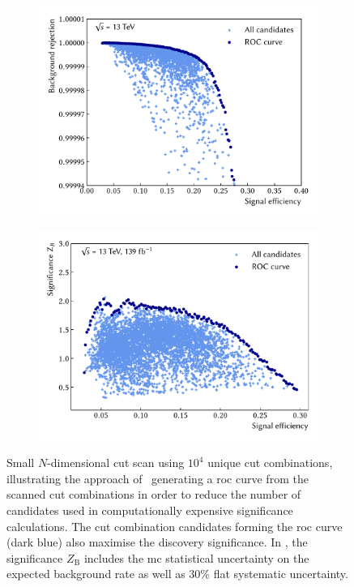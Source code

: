  \begin{figure}
	\centering
	\begin{subfigure}[b]{0.5\linewidth}
		\centering\includegraphics[width=1.0\textwidth]{N-1_cut_scan/roc_curve_thesis_plots}
		\caption{\label{fig:roc_curve}}
	\end{subfigure}\hfill
	\begin{subfigure}[b]{0.5\linewidth}
		\centering\includegraphics[width=1.0\textwidth]{N-1_cut_scan/z_vs_effs_thesis_plots}
		\caption{\label{fig:z_vs_eff}}
	\end{subfigure}\hfill

	\caption{Small $N$-dimensional cut scan using $10^4$ unique cut combinations, illustrating the approach of~ generating a \gls{roc} curve from the scanned cut combinations in order to  reduce the number of candidates used in computationally expensive significance calculations. The cut combination candidates forming the \gls{roc} curve (dark blue) also maximise the discovery significance. In , the significance $Z_\mathrm{B}$ includes the \gls{mc} statistical uncertainty on the expected background rate as well as 30\% flat systematic uncertainty.} 
	\label{fig:ahoi_examples}
\end{figure}

